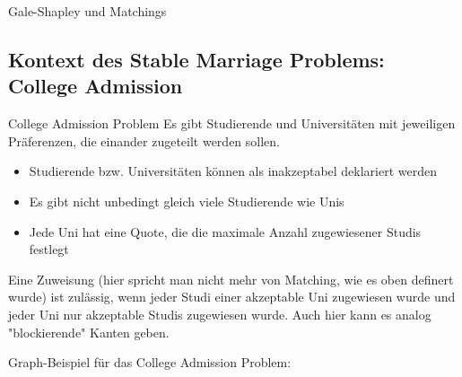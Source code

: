 \documentclass{panikzettel}
\begin{document}
{\begin{theo}{Gale-Shapley und Matchings}
\end{theo}

\subsection{Kontext des Stable Marriage Problems: College Admission}

\begin{halfboxl}
	\vspace{-\baselineskip}
	\begin{defi}{College Admission Problem}
		Es gibt Studierende und Universitäten mit jeweiligen Präferenzen, die einander zugeteilt werden sollen.\\
		
		\begin{itemize}
			\item Studierende bzw. Universitäten können als inakzeptabel deklariert werden
			\item Es gibt nicht unbedingt gleich viele Studierende wie Unis
			\item Jede Uni hat eine Quote, die die maximale Anzahl zugewiesener Studis festlegt
		\end{itemize}
	
	Eine Zuweisung (hier spricht man nicht mehr von Matching, wie es oben definert wurde) ist zulässig, wenn jeder Studi einer akzeptable Uni zugewiesen wurde und jeder Uni nur akzeptable Studis zugewiesen wurde. Auch hier kann es analog "blockierende" Kanten geben.
	\end{defi}
\end{halfboxl}%
\begin{halfboxr}
	\vspace{-\baselineskip}
	Graph-Beispiel für das College Admission Problem:\\
	
	\begin{center}
\end{center}
\end{halfboxr}}
\end{document}
